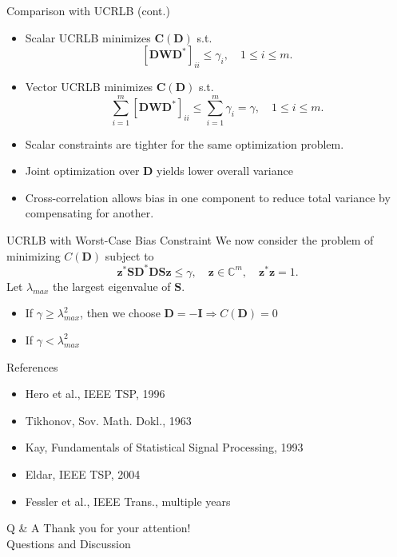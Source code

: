 \documentclass{beamer}
\begin{document}
\begin{frame}{Comparison with UCRLB (cont.)}
\begin{itemize}
    \item Scalar UCRLB minimizes $\mathbf{C}(\mathbf{D})$ s.t. 
    \[[\mathbf{D}\mathbf{W}\mathbf{D}^*]_{ii} \leq \gamma_i, \quad 1 \leq i \leq m.\]
    \item Vector UCRLB minimizes $\mathbf{C}(\mathbf{D})$ s.t. 
    \[\sum_{i=1}^m[\mathbf{D}\mathbf{W}\mathbf{D}^*]_{ii} \leq \sum_{i=1}^m\gamma_i = \gamma, 
    \quad 1 \leq i \leq m.\]
    \item Scalar constraints are tighter for the same optimization problem.
    \item Joint optimization over \( \mathbf{D} \) yields lower overall variance
    \item Cross-correlation allows bias in one component to reduce total variance by compensating for another.
\end{itemize}
\end{frame}


\begin{frame}{UCRLB with Worst-Case Bias Constraint}
We now consider the problem of minimizing $C(\mathbf{D})$ subject to
\[
\mathbf{z}^*\mathbf{S}\mathbf{D}^*\mathbf{D}\mathbf{S}\mathbf{z} \leq \gamma, \quad \mathbf{z} \in \mathbb{C}^m, \quad \mathbf{z}^*\mathbf{z} = 1.
\]
Let $\lambda_{max}$ the largest eigenvalue of $\mathbf{S}$.
\begin{itemize}
    \item If $\gamma \geq \lambda_{max}^2$, then we choose 
    $\mathbf{D} = -\mathbf{I} \Rightarrow C(\mathbf{D}) = 0$
    \item If $\gamma < \lambda_{max}^2$
\end{itemize}
\end{frame}




\begin{frame}{References}
  \scriptsize
  \begin{itemize}
    \item Hero et al., IEEE TSP, 1996
    \item Tikhonov, Sov. Math. Dokl., 1963
    \item Kay, Fundamentals of Statistical Signal Processing, 1993
    \item Eldar, IEEE TSP, 2004
    \item Fessler et al., IEEE Trans., multiple years
  \end{itemize}
\end{frame}

\begin{frame}{Q \& A}
  \centering
  Thank you for your attention! \\
  Questions and Discussion
\end{frame}
\end{document}
